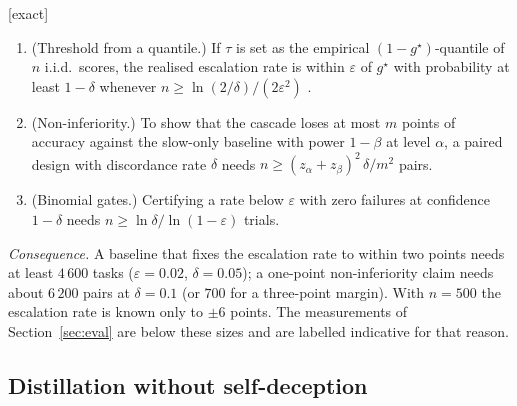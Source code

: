 \begin{proposition} \textnormal{[exact]}
\label{prop:samples}
\begin{enumerate}[label=(\roman*)]
\item (Threshold from a quantile.) If $\tau$ is set as the empirical
$(1-g^\star)$-quantile of $n$ i.i.d.\ scores, the realised escalation rate is
within $\varepsilon$ of $g^\star$ with probability at least $1-\delta$ whenever
$n\ge\ln(2/\delta)/(2\varepsilon^2)$ \cite{massart1990dkw}.
\item (Non-inferiority.) To show that the cascade loses at most $m$ points of
accuracy against the slow-only baseline with power $1-\beta$ at level $\alpha$,
a paired design with discordance rate $\delta$ needs
$n\ge(z_\alpha+z_\beta)^2\,\delta/m^2$ pairs.
\item (Binomial gates.) Certifying a rate below $\varepsilon$ with zero failures
at confidence $1-\delta$ needs $n\ge\ln\delta/\ln(1-\varepsilon)$ trials.
\end{enumerate}
\end{proposition}
\emph{Consequence.} A baseline that fixes the escalation rate to within two points
needs at least $4\,600$ tasks ($\varepsilon=0.02$, $\delta=0.05$); a one-point
non-inferiority claim needs about $6\,200$ pairs at $\delta=0.1$ (or $700$ for
a three-point margin). With $n=500$ the escalation rate is known only to
$\pm6$ points. The measurements of Section~\ref{sec:eval} are below these
sizes and are labelled indicative for that reason.

\subsection{Distillation without self-deception}

